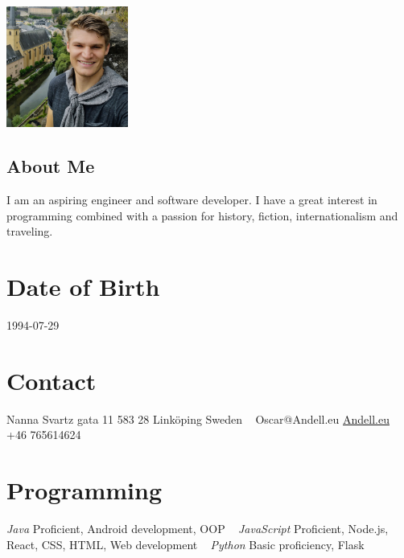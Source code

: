 \documentclass[]{k-cv} %
\begin{document}


\begin{aside} %
\includegraphics[width=4cm, height=4cm]{oscar2.jpg}
\begin{flushleft}
\section{About Me}
\color{gray}I am an aspiring engineer and software developer. I have a great interest in programming combined with a passion for history, fiction, internationalism and traveling. 
\end{flushleft}
\section{Date of Birth}
\color{gray}1994-07-29
\section{Contact}
Nanna Svartz gata 11
583 28 Linköping
Sweden
~
Oscar@Andell.eu
\href{http://Andell.eu/Oscar}{Andell.eu}
+46 765614624

\section{Programming}
\color{black}\textit{Java}
\color{gray}Proficient, Android development, OOP
~
\color{black}\textit{JavaScript}
\color{gray}Proficient, Node.js, React, CSS, HTML, Web development
~
\color{black}\textit{Python}
\color{gray}Basic proficiency, Flask
\end{aside}

\end{document}
